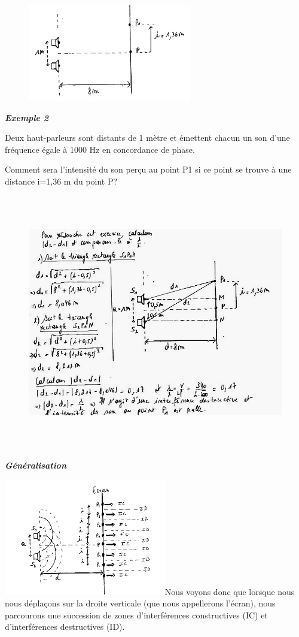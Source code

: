 \begin{figure}
\centering
\includegraphics[width=7.154cm,height=4.233cm]{Pictures/1000000100000197000000F1DA056A96FDEF75DB.png}
\caption{}
\end{figure}

\emph{\textbf{Exemple 2}}

Deux haut-parleurs sont distants de 1 mètre et émettent chacun un son
d'une fréquence égale à 1000 Hz en concordance de phase.

Comment sera l'intensité du son perçu au point P1 si ce point se trouve
à une distance i=1,36 m du point P?

\begin{figure}
\centering
\includegraphics[width=15.545cm,height=11.171cm]{Pictures/100000010000025F000001BE110A2F11D2815100.png}
\caption{}
\end{figure}

\emph{\textbf{Généralisation}}

\includegraphics[width=7.086cm,height=5.068cm]{Pictures/10000001000001CB00000148F2D7DB2B0F2EC580.png}Nous
voyons donc que lorsque nous nous déplaçons sur la droite verticale (que
nous appellerons l'écran), nous parcourons une succession de zones
d'interférences constructives (IC) et d'interférences destructives (ID).


